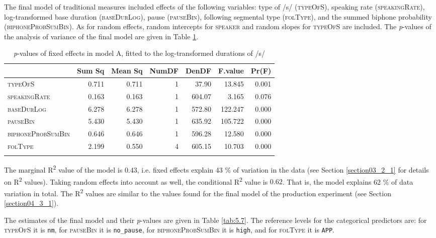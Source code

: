 The final model of traditional measures included effects of the following variables: type of /s/ (\textsc{typeOfS}), speaking rate (\textsc{speakingRate}), log-transformed base duration (\textsc{baseDurLog}), pause (\textsc{pauseBin}), following segmental type (\textsc{folType}), and the summed biphone probability (\textsc{biphoneProbSumBin}). As for random effects, random intercepts for \textsc{speaker} and random slopes for \textsc{typeOfS} are included. The \textit{p}-values of the analysis of variance of the final model are given in Table \ref{tab:5.6}.

\begin{table}\fontsize{10}{11}
\caption{\textit{p}-values of fixed effects in model A, fitted to the log-transformed durations of /s/}
\label{tab:5.6}
\centering
\begin{tabular}{lrrrrrr} 
\lsptoprule
~                 & Sum Sq & Mean Sq & NumDF & DenDF  & F.value & Pr(F)  \\ 
\midrule
\textsc{typeOfS}           & 0.711  & 0.711   & 1     & 37.90  & 13.845  & 0.001  \\
\textsc{speakingRate}      & 0.163  & 0.163   & 1     & 604.07 & 3.165   & 0.076  \\
\textsc{baseDurLog}        & 6.278  & 6.278   & 1     & 572.80 & 122.247 & 0.000  \\
\textsc{pauseBin}          & 5.430  & 5.430   & 1     & 635.92 & 105.722 & 0.000  \\
\textsc{biphoneProbSumBin} & 0.646  & 0.646   & 1     & 596.28 & 12.580  & 0.000  \\
\textsc{folType}           & 2.199  & 0.550   & 4     & 605.15 & 10.703  & 0.000  \\
\lspbottomrule
\end{tabular}
\end{table}

The marginal R\textsuperscript{2} value of the model is $0.43$, i.e. fixed effects explain 43 \% of variation in the data (see Section \ref{section03_2_1} for details on R\textsuperscript{2} values). Taking random effects into account as well, the conditional R\textsuperscript{2} value is $0.62$. That is, the model explains 62 \% of data variation in total. The R\textsuperscript{2} values are similar to the values found for the final model of the production experiment (see Section \ref{section04_3_1}).

The estimates of the final model and their \textit{p}-values are given in Table \ref{tab:5.7}. The reference levels for the categorical predictors are: for \textsc{typeOfS} it is \texttt{nm}, for \textsc{pauseBin} it is \texttt{no\_pause}, for \textsc{biphoneProbSumBin} it is \texttt{high}, and for \textsc{folType} it is \texttt{APP}.

